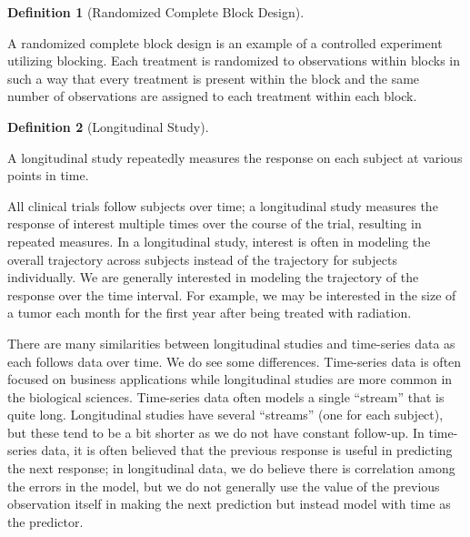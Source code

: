 \documentclass[
  letterpaper,
  DIV=11,
  numbers=noendperiod]{scrreprt}
\theoremstyle{definition}
\theoremstyle{definition}
\newtheorem{definition}{Definition}[chapter]
\theoremstyle{remark}
\begin{document}
\begin{definition}[Randomized Complete Block
Design]\protect\hypertarget{def-rcbd}{}\label{def-rcbd}

A randomized complete block design is an example of a controlled
experiment utilizing blocking. Each treatment is randomized to
observations within blocks in such a way that every treatment is present
within the block and the same number of observations are assigned to
each treatment within each block.

\end{definition}

\begin{definition}[Longitudinal
Study]\protect\hypertarget{def-longitudinal-study}{}\label{def-longitudinal-study}

A longitudinal study repeatedly measures the response on each subject at
various points in time.

\end{definition}

All clinical trials follow subjects over time; a longitudinal study
measures the response of interest multiple times over the course of the
trial, resulting in repeated measures. In a longitudinal study, interest
is often in modeling the overall trajectory across subjects instead of
the trajectory for subjects individually. We are generally interested in
modeling the trajectory of the response over the time interval. For
example, we may be interested in the size of a tumor each month for the
first year after being treated with radiation.

\begin{tcolorbox}[enhanced jigsaw, bottomrule=.15mm, titlerule=0mm, bottomtitle=1mm, colback=white, coltitle=black, rightrule=.15mm, leftrule=.75mm, toprule=.15mm, toptitle=1mm, left=2mm, opacityback=0, colframe=quarto-callout-note-color-frame, breakable, title=\textcolor{quarto-callout-note-color}{\faInfo}\hspace{0.5em}{Note}, arc=.35mm, colbacktitle=quarto-callout-note-color!10!white, opacitybacktitle=0.6]

There are many similarities between longitudinal studies and time-series
data as each follows data over time. We do see some differences.
Time-series data is often focused on business applications while
longitudinal studies are more common in the biological sciences.
Time-series data often models a single ``stream'' that is quite long.
Longitudinal studies have several ``streams'' (one for each subject),
but these tend to be a bit shorter as we do not have constant follow-up.
In time-series data, it is often believed that the previous response is
useful in predicting the next response; in longitudinal data, we do
believe there is correlation among the errors in the model, but we do
not generally use the value of the previous observation itself in making
the next prediction but instead model with time as the predictor.

\end{tcolorbox}
\end{document}
